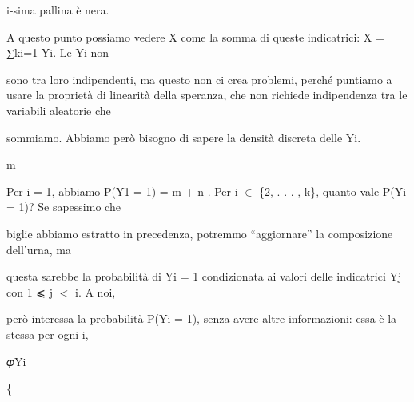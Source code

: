 \documentclass[a4paper,portrait,12pt]{article}
\begin{document}
\begin{flushleft}
i-sima pallina \`{e} nera.
\end{flushleft}





\begin{flushleft}
A questo punto possiamo vedere X come la somma di queste indicatrici: X = ∑ki=1 Yi. Le Yi non
\end{flushleft}


\begin{flushleft}
sono tra loro indipendenti, ma questo non ci crea problemi, perch\'{e} puntiamo a usare la propriet\`{a} di linearit\`{a} della speranza, che non richiede indipendenza tra le variabili aleatorie che
\end{flushleft}


\begin{flushleft}
sommiamo. Abbiamo per\`{o} bisogno di sapere la densit\`{a} discreta delle Yi.
\end{flushleft}


\begin{flushleft}
m
\end{flushleft}


\begin{flushleft}
Per i = 1, abbiamo P(Y1 = 1) = m + n . Per i $\in$ \{2, . . . , k\}, quanto vale P(Yi = 1)? Se sapessimo che
\end{flushleft}


\begin{flushleft}
biglie abbiamo estratto in precedenza, potremmo {``}aggiornare'' la composizione dell'urna, ma
\end{flushleft}


\begin{flushleft}
questa sarebbe la probabilit\`{a} di Yi = 1 condizionata ai valori delle indicatrici Yj con 1 ⩽ j $<$ i. A noi,
\end{flushleft}


\begin{flushleft}
per\`{o} interessa la probabilit\`{a} P(Yi = 1), senza avere altre informazioni: essa \`{e} la stessa per ogni i,
\end{flushleft}


\begin{flushleft}
𝜑Yi
\end{flushleft}





\{
\end{document}
